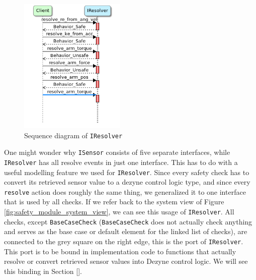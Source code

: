 \documentclass[12pt]{scrreprt}
\begin{document}
\begin{figure}[H]
    \centering
    \includegraphics[width=0.45\textwidth]{Figures/results/modelling_figures/IResolver/IResolver_seq.png}
    \caption{Sequence diagram of \texttt{IResolver}}
    \label{fig:IResolver_seq}
\end{figure}

One might wonder why \texttt{ISensor} consists of five separate interfaces, while \texttt{IResolver} has all resolve events in just one interface. This has to do with a useful modelling feature we used for \texttt{IResolver}. Since every safety check has to convert its retrieved sensor value to a dezyne control logic type, and since every \texttt{resolve} action does roughly the same thing, we generalized it to one interface that is used by all checks. If we refer back to the system view of Figure \ref{fig:safety_module_system_view}, we can see this usage of \texttt{IResolver}. All checks, except \texttt{BaseCaseCheck} (\texttt{BaseCaseCheck} does not actually check anything and serves as the base case or default element for the linked list of checks), are connected to the grey square on the right edge, this is the port of \texttt{IResolver}. This port is to be bound in implementation code to functions that actually resolve or convert retrieved sensor values into Dezyne control logic. We will see this binding in Section \ref{}.
\end{document}
